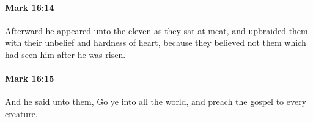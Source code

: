 		\paragraph{Mark 16:14} %
			\label{MARK-16-14}

			Afterward he appeared unto the eleven as they sat at meat, and upbraided them with their unbelief and hardness of heart, because they believed not them which had seen him after he was risen.

			\begin{framed}
			\scriptsize
				\begin{compactdesc}
					\item[SBLG] 
				\end{compactdesc}
			\end{framed}

		\paragraph{Mark 16:15} %
			\label{MARK-16-15}

			And he said unto them, Go ye into all the world, and preach the gospel to every creature.

